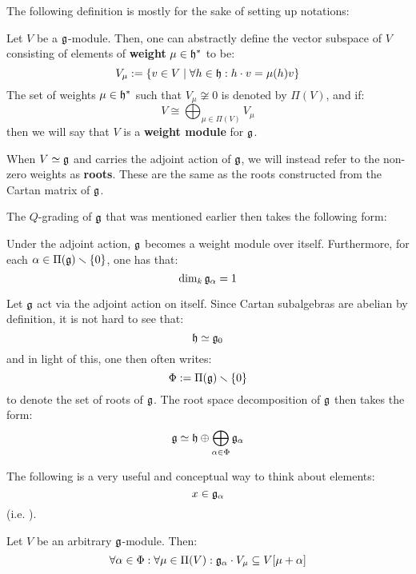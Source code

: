        The following definition is mostly for the sake of setting up notations:
        \begin{definition}
            Let $V$ be a $\mathfrak{g}$-module. Then, one can abstractly define the vector subspace of $V$ consisting of elements of \textbf{weight} $\mu \in \mathfrak{h}^*$ to be:
                $$V_{\mu} := \{v \in V \mid \forall h \in \mathfrak{h}: h \cdot v = \mu(h) v\}$$
            The set of weights $\mu \in \mathfrak{h}^*$ such that $V_{\mu} \not \cong 0$ is denoted by $\Pi(V)$, and if:
                $$V \cong \bigoplus_{\mu \in \Pi(V)} V_{\mu}$$
            then we will say that $V$ is a \textbf{weight module} for $\mathfrak{g}$. 

            When $V \simeq \mathfrak{g}$ and carries the adjoint action of $\mathfrak{g}$, we will instead refer to the non-zero weights as \textbf{roots}. These are the same as the roots constructed from the Cartan matrix of $\mathfrak{g}$.
        \end{definition}
        The $Q$-grading of $\mathfrak{g}$ that was mentioned earlier then takes the following form:
        \begin{theorem} \label{theorem: root_space_decomposition_for_finite_dimensional_simple_lie_algebras}
            Under the adjoint action, $\mathfrak{g}$ becomes a weight module over itself. Furthermore, for each $\alpha \in \Pi(\mathfrak{g}) \smallsetminus \{0\}$, one has that:
                $$\dim_k \mathfrak{g}_{\alpha} = 1$$
        \end{theorem}
        \begin{convention}
            Let $\mathfrak{g}$ act via the adjoint action on itself. Since Cartan subalgebras are abelian by definition, it is not hard to see that:
                $$\mathfrak{h} \simeq \mathfrak{g}_0$$
            and in light of this, one then often writes:
                $$\Phi := \Pi(\mathfrak{g}) \smallsetminus \{0\}$$
            to denote the set of roots of $\mathfrak{g}$. The root space decomposition of $\mathfrak{g}$ then takes the form:
                $$\mathfrak{g} \simeq \mathfrak{h} \oplus \bigoplus_{\alpha \in \Phi} \mathfrak{g}_{\alpha}$$
        \end{convention}
        The following is a very useful and conceptual way to think about elements:
            $$x \in \mathfrak{g}_{\alpha}$$
        (i.e. ). 
        \begin{lemma}
            Let $V$ be an arbitrary $\mathfrak{g}$-module. Then:
                $$\forall \alpha \in \Phi: \forall \mu \in \Pi(V): \mathfrak{g}_{\alpha} \cdot V_{\mu} \subseteq V[\mu + \alpha]$$
        \end{lemma}
